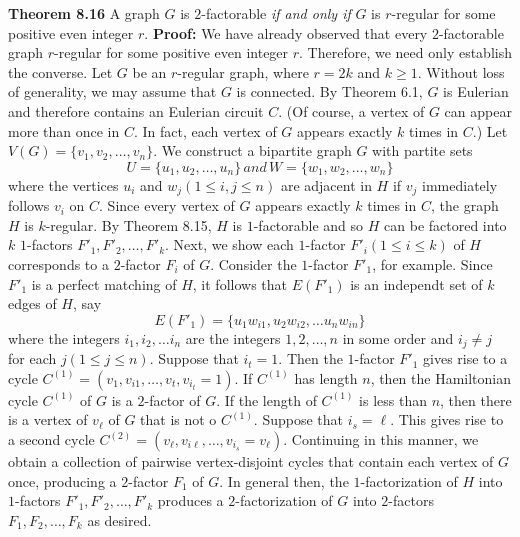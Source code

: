 \nopagenumbers
{\bf Theorem 8.16}
\vskip 6pt
A graph $G$ is $2$-factorable {\it if and only if} $G$ is $r$-regular for some positive even integer $r$.
\vskip 10pt
{\bf Proof:}
\vskip 6pt
We have already observed that every $2$-factorable graph $r$-regular for some positive even integer $r$. Therefore, we need only establish the converse. Let $G$ be an $r$-regular graph, where $r=2k$ and $k \geq 1$. Without loss of generality, we may assume that $G$ is connected. By Theorem 6.1, $G$ is Eulerian and therefore contains an Eulerian circuit $C$. (Of course, a vertex of $G$ can appear more than once in $C$. In fact, each vertex of $G$ appears exactly $k$ times in $C$.)
\vskip 1mm
Let $V(G)= \lbrace v_1,v_2, \ldots ,v_n \rbrace$. We construct a bipartite graph $G$ with partite sets $$U= \lbrace u_1,u_2, \ldots ,u_n \rbrace \, and \, W= \lbrace w_1,w_2, \ldots , w_n \rbrace$$ where the vertices $u_i$ and $w_j(1 \leq i,j \leq n)$ are adjacent in $H$ if $v_j$ immediately follows $v_i$ on $C$. Since every vertex of $G$ appears exactly $k$ times in $C$, the graph $H$ is $k$-regular. By Theorem 8.15, $H$ is $1$-factorable and so $H$ can be factored into $k$ $1$-factors $F'_1,F'_2, \ldots , F'_k$.
\vskip 1mm
Next, we show each $1$-factor $F'_i(1 \leq i \leq k)$ of $H$ corresponds to a $2$-factor $F_i$ of $G$. Consider the $1$-factor $F'_1$, for example. Since $F'_1$ is a perfect matching of $H$, it follows that $E(F'_1)$ is an independt set of $k$ edges of $H$, say $$E(F'_1)= \lbrace u_1w_{i1} ,u_2w_{i2}, \ldots u_nw_{in} \rbrace$$ where the integers $i_1,i_2, \ldots i_n$ are the integers $1,2, \ldots ,n$ in some order and $i_j \neq j$ for each $j(1 \leq j \leq n)$. Suppose that $i_t=1$. Then the $1$-factor $F'_1$ gives rise to a cycle $C^{(1)}=(v_1,v_{i1}, \ldots , v_t, v_{i_t}=1)$. If $C^{(1)}$ has length $n$, then the Hamiltonian cycle $C^{(1)}$ of $G$ is a $2$-factor of $G$. If the length of $C^{(1)}$ is less than $n$, then there is a vertex of $v_{\ell}$ of $G$ that is not o $C^{(1)}$. Suppose that $i_s= \ell$. This gives rise to a second cycle $C^{(2)}= (v_{\ell},v_{i\ell}, \ldots ,v_{i_s}=v_{\ell})$. Continuing in this manner, we obtain a collection of pairwise vertex-disjoint cycles that contain each vertex of $G$ once, producing a $2$-factor $F_1$ of $G$. In general then, the $1$-factorization of $H$ into $1$-factors $F'_1,F'_2, \ldots , F'_k$ produces a $2$-factorization of $G$ into $2$-factors $F_1,F_2, \ldots , F_k$ as desired.



\vfill\eject
